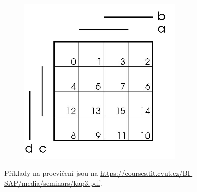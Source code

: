 \documentclass{szzclass}
\begin{document}
\begin{figure}[h]
\includegraphics[width=8cm]{karnaugh}
\end{figure}

Příklady na procvičení jsou na \url{https://courses.fit.cvut.cz/BI-SAP/media/seminars/kap3.pdf}.
\end{document}
